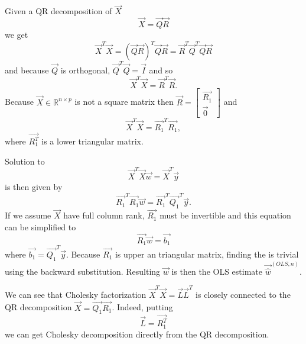 Given a QR decomposition of $\vec{X}$
\begin{equation}
    \vec{X} = \vec{Q}\vec{R}
\end{equation}
we get
\begin{equation}
    \vec{X}^T\vec{X} = (\vec{Q}\vec{R})^T \vec{Q}\vec{R} = \vec{R}^T\vec{Q}^T\vec{Q}\vec{R}
\end{equation}
and because $\vec{Q}$ is orthogonal, $\vec{Q}^T\vec{Q} = \vec{I}$ and so
\begin{equation}
    \vec{X}^T\vec{X} = \vec{R}^T\vec{R}.
\end{equation}
Because $\vec{X} \in  \mathbb{R}^{n \times p}$ is not a square matrix then 
$
\vec{R} = 
\begin{bmatrix}
    \vec{R_1} \\
    \vec{0}
\end{bmatrix}
$
and
\begin{equation}
    \vec{X}^T\vec{X} = \vec{R_1}^T\vec{R_1},
\end{equation}
 where $\vec{R_1^T}$ is a lower triangular matrix. 

Solution to
\begin{equation}
    \vec{X}^T\vec{X}\vec{w} = \vec{X}^T\vec{y}
\end{equation}
is then given by 
\begin{equation}
    \vec{R_1}^T\vec{R_1}\vec{w} = \vec{R_1}^T\vec{Q_1}^T \vec{y}.
\end{equation}
If we assume $\vec{X}$ have full column rank, $\vec{R_1}$ must be invertible and this equation can be simplified to
\begin{equation}
    \vec{R_1}\vec{w} = \vec{b_1}
\end{equation}
where $ \vec{b_1} = \vec{Q_1}^T \vec{y}$. Because $\vec{R_1}$ is upper an triangular matrix, finding the is trivial using the backward substitution. Resulting $\vec{w}$ is then the OLS estimate $\vec{\hat{w}}^{(OLS,n)}$.

\begin{note}
        We can see that Cholesky factorization  $\vec{X}^T\vec{X} = \vec{L}\vec{L}^T$ is closely connected to the QR decomposition $\vec{X} = \vec{Q_1}\vec{R_1}$. Indeed, putting   
        \begin{equation} \label{qrcholesky}
                \vec{L} = \vec{R_1^T}
            \end{equation}
        we can get Cholesky decomposition directly from the QR decomposition.
\end{note}

